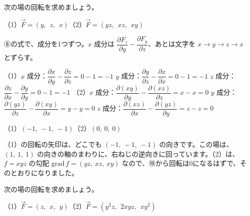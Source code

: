 \begin{reidai}
次の場の回転を求めましょう。\par
（1）\nobreak $\vec F=(y,\ \ z,\ \ x)$\qquad（2）\nobreak $\vec F=(yz,\ \ xz,\ \ xy)$\par
\kangaekata ⑧の式で、成分を1つずつ。$x$ 成分は $\dfrac{\partial F_z}{\partial y}-\dfrac{\partial F_y}{\partial z}$、あとは文字を $x\to y\to z\to x$ とずらす。\par
\shiki（1）$x$ 成分：$\dfrac{\partial x}{\partial y}-\dfrac{\partial z}{\partial z}=0-1=-1$\kviiikq
$y$ 成分：$\dfrac{\partial y}{\partial z}-\dfrac{\partial x}{\partial x}=0-1=-1$\kviiikq
$z$ 成分：$\dfrac{\partial z}{\partial x}-\dfrac{\partial y}{\partial y}=0-1=-1$\kviiikq
（2）$x$ 成分：$\dfrac{\partial(xy)}{\partial y}-\dfrac{\partial(xz)}{\partial z}=x-x=0$\kviiikq
$y$ 成分：$\dfrac{\partial(yz)}{\partial z}-\dfrac{\partial(xy)}{\partial x}=y-y=0$\kviiikq
$z$ 成分：$\dfrac{\partial(xz)}{\partial x}-\dfrac{\partial(yz)}{\partial y}=z-z=0$\par
\kotae（1）\nobreak $(-1,\ -1,\ -1)$\quad（2）\nobreak $(0,\ 0,\ 0)$
\end{reidai}
\noindent （1）の回転の矢印は、どこでも $(-1,\ -1,\ -1)$ の向きです。この場は、$(1,\ 1,\ 1)$ の向きの軸のまわりに、右ねじの逆向きに回っています。（2）は、$f=xyz$ の勾配 $\mathrm{grad}\,f=(yz,\ xz,\ xy)$ なので、⑩から回転は0になるはずで、そのとおりになりました。

\begin{jibun}
次の場の回転を求めましょう。\par
（1）\nobreak $\vec F=(z,\ \ x,\ \ y)$\qquad（2）\nobreak $\vec F=(y^2z,\ \ 2xyz,\ \ xy^2)$
\end{jibun}

